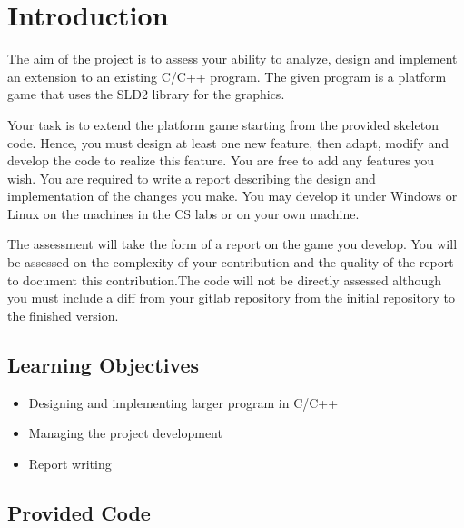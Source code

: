 \section{Introduction}

The aim of the project is to assess your ability to analyze, design
and implement an extension to an existing C/C++ program. The given program is a platform game that uses the SLD2 library for the graphics.

Your task is to extend the platform game starting from the provided skeleton code.
Hence, you must design at least one new feature, then adapt, modify and develop the code to realize this feature.
You are free to add any features you wish. You are required to write a
report describing the design and implementation of the changes you
make. You may develop it under Windows or Linux on the machines in the CS labs or on your own machine.

The assessment will take the form of a report on the game you develop.
You will be assessed on the complexity of your contribution and the quality of the report to document this contribution.The code will not be directly assessed although you must include a diff from your gitlab repository from the initial repository to the finished version.

\subsection{Learning Objectives}
\begin{itemize}
  \item Designing and implementing larger program in C/C++
  \item Managing the project development
  \item Report writing
\end{itemize}

\subsection{Provided Code}

